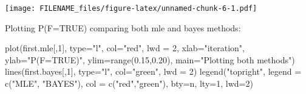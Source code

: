 \documentclass[
]{article}
\newenvironment{Shaded}{\begin{snugshade}}{\end{snugshade}}
\newcommand{\AttributeTok}[1]{\textcolor[rgb]{0.77,0.63,0.00}{#1}}
\newcommand{\CommentTok}[1]{\textcolor[rgb]{0.56,0.35,0.01}{\textit{#1}}}
\newcommand{\DecValTok}[1]{\textcolor[rgb]{0.00,0.00,0.81}{#1}}
\newcommand{\FloatTok}[1]{\textcolor[rgb]{0.00,0.00,0.81}{#1}}
\newcommand{\FunctionTok}[1]{\textcolor[rgb]{0.00,0.00,0.00}{#1}}
\newcommand{\NormalTok}[1]{#1}
\newcommand{\OtherTok}[1]{\textcolor[rgb]{0.56,0.35,0.01}{#1}}
\newcommand{\SpecialCharTok}[1]{\textcolor[rgb]{0.00,0.00,0.00}{#1}}
\newcommand{\StringTok}[1]{\textcolor[rgb]{0.31,0.60,0.02}{#1}}
\begin{document}
\begin{Shaded}
\end{Shaded}

\texttt{[image: FILENAME\_files/figure-latex/unnamed-chunk-6-1.pdf]}

Plotting P(F=TRUE) comparing both mle and bayes methods:

\begin{Shaded}
\begin{Highlighting}[]
\FunctionTok{plot}\NormalTok{(first.mle[,}\DecValTok{1}\NormalTok{], }\AttributeTok{type=}\StringTok{"l"}\NormalTok{, }\AttributeTok{col=}\StringTok{"red"}\NormalTok{, }\AttributeTok{lwd =} \DecValTok{2}\NormalTok{, }\AttributeTok{xlab=}\StringTok{"iteration"}\NormalTok{, }\AttributeTok{ylab=}\StringTok{"P(F=TRUE)"}\NormalTok{, }\AttributeTok{ylim=}\FunctionTok{range}\NormalTok{(}\FloatTok{0.15}\NormalTok{,}\FloatTok{0.20}\NormalTok{), }\AttributeTok{main=}\StringTok{"Plotting both methods"}\NormalTok{)}
\FunctionTok{lines}\NormalTok{(first.bayes[,}\DecValTok{1}\NormalTok{], }\AttributeTok{type=}\StringTok{"l"}\NormalTok{, }\AttributeTok{col=}\StringTok{"green"}\NormalTok{, }\AttributeTok{lwd =} \DecValTok{2}\NormalTok{)}
\FunctionTok{legend}\NormalTok{(}\StringTok{"topright"}\NormalTok{, }\AttributeTok{legend =} \FunctionTok{c}\NormalTok{(}\StringTok{"MLE"}\NormalTok{, }\StringTok{"BAYES"}\NormalTok{), }\AttributeTok{col =} \FunctionTok{c}\NormalTok{(}\StringTok{"red"}\NormalTok{,}\StringTok{"green"}\NormalTok{), }\AttributeTok{bty=}\StringTok{\textquotesingle{}n\textquotesingle{}}\NormalTok{, }\AttributeTok{lty=}\DecValTok{1}\NormalTok{, }\AttributeTok{lwd=}\DecValTok{2}\NormalTok{)}
\end{Highlighting}
\end{Shaded}
\end{document}
